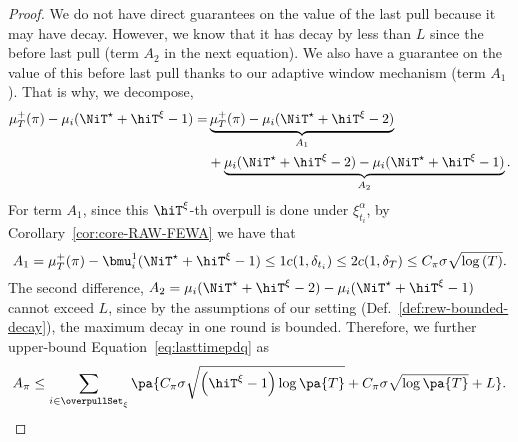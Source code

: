 \begin{proof}
We do not have direct guarantees on the value of the last pull because it may have decay. However, we know that it has decay by less than $L$ since the before last pull (term $A_2$ in the next equation). We also have a guarantee on the value of this before last pull thanks to our adaptive window mechanism (term $A_1$).
That is why, we decompose, 
\begin{align*}
\mu^+_T(\pi) - \mu_i(\NiT^{\star} + \hiT^\xi - 1) %
= &\underbrace{\mu^+_T(\pi) - \mu_i(\NiT^{\star} + \hiT^\xi-2)}_{A_1} \\&+ 
\underbrace{\mu_i(\NiT^{\star} + \hiT^\xi-2) -  \mu_i(\NiT^{\star} + \hiT^\xi - 1)}_{A_2}.
\end{align*}
For term $A_1$, since this $\hiT^\xi$-th overpull is done under $\xi^\alpha_{t_i}$, by Corollary~\ref{cor:core-RAW-FEWA} we have that
\[
A_1 = \mu^+_T(\pi) - \bmu_i^1(\NiT^{\star} + \hiT^\xi-1) \leq 1c(1, \delta_{t_i}) \leq 2c(1,\delta_{T}) \leq C_\pi \sigma \sqrt{\log\left(T\right)} .
\] 
The second difference, 
$A_2 = \mu_i(\NiT^{\star} + \hiT^\xi-2) -  \mu_i(\NiT^{\star} + \hiT^\xi - 1 )$  
cannot exceed $L$, since by the assumptions of our setting  (Def.~\ref{def:rew-bounded-decay}), the maximum decay in one round is bounded.
Therefore, we further upper-bound Equation~\ref{eq:lasttimepdq} as
\begin{align}
A_{\pi} \leq \sum_{i\in \overpullSet_\xi} \pa{C_\pi \sigma \sqrt{\left(\hiT^\xi -1\right)\log\pa{T}} + C_\pi \sigma\sqrt{\log{\pa{T}}}+  L}.
\label{HPevent0}
\end{align}
\end{proof}



